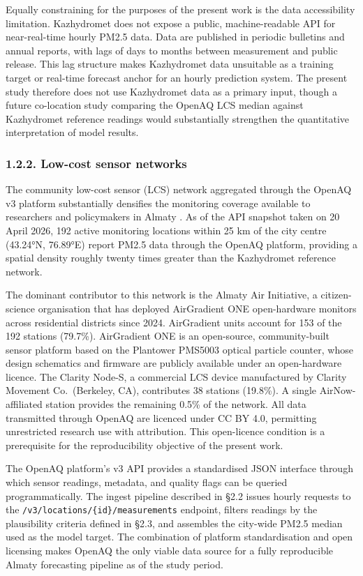 Equally constraining for the purposes of the present work is the data accessibility limitation. Kazhydromet does not expose a public, machine-readable API for near-real-time hourly PM2.5 data. Data are published in periodic bulletins and annual reports, with lags of days to months between measurement and public release. This lag structure makes Kazhydromet data unsuitable as a training target or real-time forecast anchor for an hourly prediction system. The present study therefore does not use Kazhydromet data as a primary input, though a future co-location study comparing the OpenAQ LCS median against Kazhydromet reference readings would substantially strengthen the quantitative interpretation of model results.

\subsubsection{1.2.2. Low-cost sensor networks}\label{low-cost-sensor-networks}

The community low-cost sensor (LCS) network aggregated through the OpenAQ v3 platform substantially densifies the monitoring coverage available to researchers and policymakers in Almaty \cite{openaq_platform}. As of the API snapshot taken on 20 April 2026, 192 active monitoring locations within 25 km of the city centre (43.24°N, 76.89°E) report PM2.5 data through the OpenAQ platform, providing a spatial density roughly twenty times greater than the Kazhydromet reference network.

The dominant contributor to this network is the Almaty Air Initiative, a citizen-science organisation that has deployed AirGradient ONE open-hardware monitors across residential districts since 2024. AirGradient units account for 153 of the 192 stations (79.7\%). AirGradient ONE is an open-source, community-built sensor platform based on the Plantower PMS5003 optical particle counter, whose design schematics and firmware are publicly available under an open-hardware licence. The Clarity Node-S, a commercial LCS device manufactured by Clarity Movement Co.~(Berkeley, CA), contributes 38 stations (19.8\%). A single AirNow-affiliated station provides the remaining 0.5\% of the network. All data transmitted through OpenAQ are licenced under CC BY 4.0, permitting unrestricted research use with attribution. This open-licence condition is a prerequisite for the reproducibility objective of the present work.

The OpenAQ platform's v3 API provides a standardised JSON interface through which sensor readings, metadata, and quality flags can be queried programmatically. The ingest pipeline described in §2.2 issues hourly requests to the \texttt{/v3/locations/\{id\}/measurements} endpoint, filters readings by the plausibility criteria defined in §2.3, and assembles the city-wide PM2.5 median used as the model target. The combination of platform standardisation and open licensing makes OpenAQ the only viable data source for a fully reproducible Almaty forecasting pipeline as of the study period.

